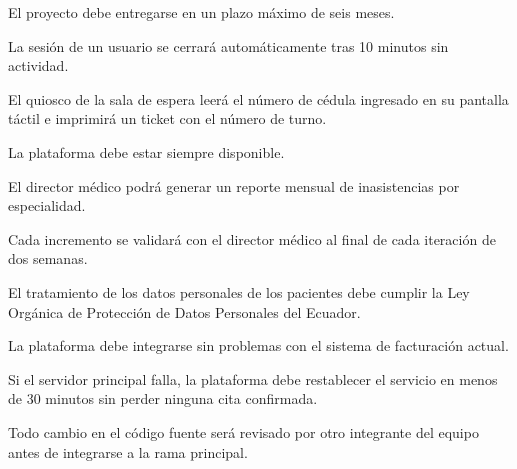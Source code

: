\documentclass[11pt,a4paper]{article}
\begin{document}
\begin{description}[
    style=standard,
    leftmargin=1.15cm,
    labelwidth=0.95cm,
    itemsep=6pt
]
\item[E11]
El proyecto debe entregarse en un plazo máximo de seis meses.

\item[E12]
La sesión de un usuario se cerrará automáticamente tras
10 minutos sin actividad.

\item[E13]
El quiosco de la sala de espera leerá el número de cédula ingresado
en su pantalla táctil e imprimirá un ticket con el número de turno.

\item[E14]
La plataforma debe estar siempre disponible.

\item[E15]
El director médico podrá generar un reporte mensual de inasistencias
por especialidad.

\item[E16]
Cada incremento se validará con el director médico al final
de cada iteración de dos semanas.

\item[E17]
El tratamiento de los datos personales de los pacientes debe cumplir
la Ley Orgánica de Protección de Datos Personales del Ecuador.

\item[E18]
La plataforma debe integrarse sin problemas con el sistema
de facturación actual.

\item[E19]
Si el servidor principal falla, la plataforma debe restablecer
el servicio en menos de 30 minutos sin perder ninguna cita confirmada.

\item[E20]
Todo cambio en el código fuente será revisado por otro integrante
del equipo antes de integrarse a la rama principal.

\end{description}
\end{document}
